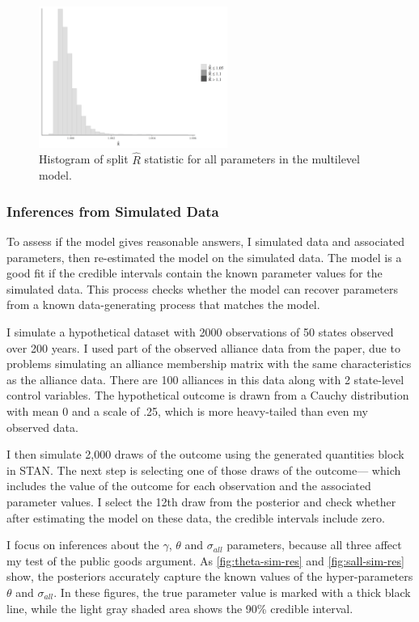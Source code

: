 \documentclass[12pt]{article}
\begin{document}
\begin{figure}[htbp]
	\centering
		\includegraphics[width=0.55\textwidth]{rhat-plot.png}
	\caption{Histogram of split $\hat{R}$ statistic for all parameters in the multilevel model.}
	\label{fig:rhat-plot}
\end{figure}


\subsubsection{Inferences from Simulated Data}


To assess if the model gives reasonable answers, I simulated data and associated parameters, then re-estimated the model on the simulated data.
The model is a good fit if the credible intervals contain the known parameter values for the simulated data. 
This process checks whether the model can recover parameters from a known data-generating process that matches the model. 


I simulate a hypothetical dataset with 2000 observations of 50 states observed over 200 years.
I used part of the observed alliance data from the paper, due to problems simulating an alliance membership matrix with the same characteristics as the alliance data. 
There are 100 alliances in this data along with 2 state-level control variables. 
The hypothetical outcome is drawn from a Cauchy distribution with mean 0 and a scale of .25, which is more heavy-tailed than even my observed data. 


I then simulate 2,000 draws of the outcome using the generated quantities block in STAN. 
The next step is selecting one of those draws of the outcome--- which includes the value of the outcome for each observation and the associated parameter values. 
I select the 12th draw from the posterior and check whether after estimating the model on these data, the credible intervals include zero. 


I focus on inferences about the $\gamma$, $\theta$ and $\sigma_{all}$ parameters, because all three affect my test of the public goods argument. 
As \autoref{fig:theta-sim-res} and \autoref{fig:sall-sim-res} show, the posteriors accurately capture the known values of the hyper-parameters $\theta$ and $\sigma_{all}$. 
In these figures, the true parameter value is marked with a thick black line, while the light gray shaded area shows the 90\% credible interval. 
\end{document}
